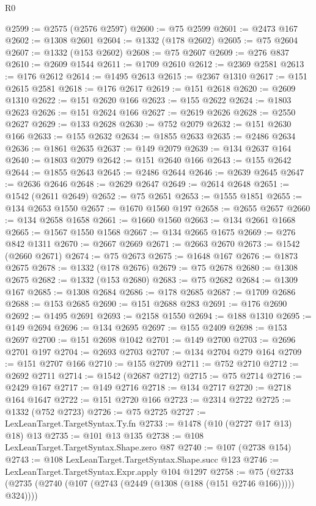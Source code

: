 \begin{lexlean}{R0}
\begin{coremodule}
@2599 := @2575 (@2576 @2597)
@2600 := @75 @2599
@2601 := @2473 @167
@2602 := @1308 @2601
@2604 := @1332 (@178 @2602)
@2605 := @75 @2604
@2607 := @1332 (@153 @2602)
@2608 := @75 @2607
@2609 := @276 @837
@2610 := @2609 @1544
@2611 := @1709 @2610
@2612 := @2369 @2581
@2613 := @176 @2612
@2614 := @1495 @2613
@2615 := @2367 @1310
@2617 := @151 @2615 @2581
@2618 := @176 @2617
@2619 := @151 @2618
@2620 := @2609 @1310
@2622 := @151 @2620 @166
@2623 := @155 @2622
@2624 := @1803 @2623
@2626 := @151 @2624 @166
@2627 := @2619 @2626
@2628 := @2550 @2627
@2629 := @133 @2628
@2630 := @752 @2079
@2632 := @151 @2630 @166
@2633 := @155 @2632
@2634 := @1855 @2633
@2635 := @2486 @2634
@2636 := @1861 @2635
@2637 := @149 @2079
@2639 := @134 @2637 @164
@2640 := @1803 @2079
@2642 := @151 @2640 @166
@2643 := @155 @2642
@2644 := @1855 @2643
@2645 := @2486 @2644
@2646 := @2639 @2645
@2647 := @2636 @2646
@2648 := @2629 @2647
@2649 := @2614 @2648
@2651 := @1542 (@2611 @2649)
@2652 := @75 @2651
@2653 := @1555 @1851
@2655 := @134 @2653 @1550
@2657 := @1670 @1560 @197
@2658 := @2655 @2657
@2660 := @134 @2658 @1658
@2661 := @1660 @1560
@2663 := @134 @2661 @1668
@2665 := @1567 @1550 @1568
@2667 := @134 @2665 @1675
@2669 := @276 @842 @1311
@2670 := @2667 @2669
@2671 := @2663 @2670
@2673 := @1542 (@2660 @2671)
@2674 := @75 @2673
@2675 := @1648 @167
@2676 := @1873 @2675
@2678 := @1332 (@178 @2676)
@2679 := @75 @2678
@2680 := @1308 @2675
@2682 := @1332 (@153 @2680)
@2683 := @75 @2682
@2684 := @1309 @167
@2685 := @1308 @2684
@2686 := @178 @2685
@2687 := @1709 @2686
@2688 := @153 @2685
@2690 := @151 @2688 @283
@2691 := @176 @2690
@2692 := @1495 @2691
@2693 := @2158 @1550
@2694 := @188 @1310
@2695 := @149 @2694
@2696 := @134 @2695
@2697 := @155 @2409
@2698 := @153 @2697
@2700 := @151 @2698 @1042
@2701 := @149 @2700
@2703 := @2696 @2701 @197
@2704 := @2693 @2703
@2707 := @134 @2704 @279 @164
@2709 := @151 @2707 @166
@2710 := @155 @2709
@2711 := @752 @2710
@2712 := @2692 @2711
@2714 := @1542 (@2687 @2712)
@2715 := @75 @2714
@2716 := @2429 @167
@2717 := @149 @2716
@2718 := @134 @2717
@2720 := @2718 @164 @1647
@2722 := @151 @2720 @166
@2723 := @2314 @2722
@2725 := @1332 (@752 @2723)
@2726 := @75 @2725
@2727 := LexLeanTarget.TargetSyntax.Ty.fn
@2733 := @1478 (@10 (@2727 @17 @13) @18) @13
@2735 := @101 @13 @135
@2738 := @108 LexLeanTarget.TargetSyntax.Shape.zero @87
@2740 := @107 (@2738 @154)
@2743 := @108 LexLeanTarget.TargetSyntax.Shape.succ @123
@2746 := LexLeanTarget.TargetSyntax.Expr.apply @104 @1297
@2758 := @75 (@2733 (@2735 (@2740 (@107 (@2743 (@2449 (@1308 (@188 (@151 @2746 @166))))) @324))))

\end{coremodule}
\end{lexlean}
